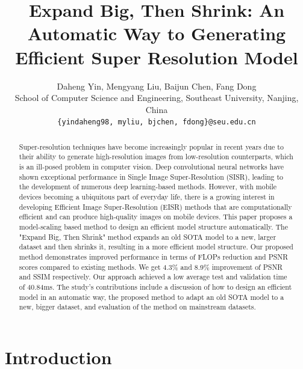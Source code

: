 \documentclass[10pt,twocolumn,letterpaper]{article}
\begin{document}
\title{Expand Big, Then Shrink: An Automatic Way to Generating Efficient Super Resolution Model}


\author{Daheng Yin, Mengyang Liu, Baijun Chen, Fang Dong\\
School of Computer Science and Engineering, Southeast University, Nanjing, China\\
{\tt\small \{yindaheng98, myliu, bjchen, fdong\}@seu.edu.cn}
}
\maketitle

\begin{abstract}
  Super-resolution techniques have become increasingly popular in recent years due to their ability to generate high-resolution images from low-resolution counterparts, which is an ill-posed problem in computer vision. Deep convolutional neural networks have shown exceptional performance in Single Image Super-Resolution (SISR), leading to the development of numerous deep learning-based methods. However, with mobile devices becoming a ubiquitous part of everyday life, there is a growing interest in developing Efficient Image Super-Resolution (EISR) methods that are computationally efficient and can produce high-quality images on mobile devices. This paper proposes a model-scaling based method to design an efficient model structure automatically. The "Expand Big, Then Shrink" method expands an old SOTA model to a new, larger dataset and then shrinks it, resulting in a more efficient model structure.
  Our proposed method demonstrates improved performance in terms of FLOPs reduction and PSNR scores compared to existing methods. We get 4.3\% and 8.9\% improvement of PSNR and SSIM respectively. Our approach achieved a low average test and validation time of 40.84ms.
  The study's contributions include a discussion of how to design an efficient model in an automatic way, the proposed method to adapt an old SOTA model to a new, bigger dataset, and evaluation of the method on mainstream datasets.
\end{abstract}

\section{Introduction}
\label{sec:intro}
\end{document}
